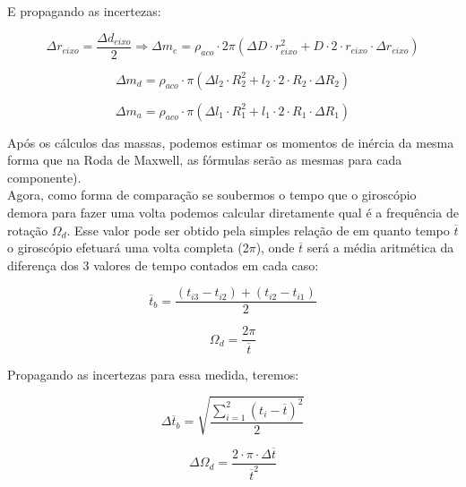 E propagando as incertezas:

\[ \Delta r_{eixo} = \frac{\Delta d_{eixo}}{2} \Rightarrow \Delta m_e = \rho_{aco} \cdot 2 \pi \left( \Delta D \cdot r_{eixo}^2 + D \cdot 2 \cdot r_{eixo} \cdot \Delta r_{eixo} \right)\]

\[ \Delta m_d = \rho_{aco} \cdot \pi \left( \Delta l_2 \cdot R_2^2 + l_2 \cdot 2 \cdot R_2 \cdot \Delta R_2 \right) \]

\[ \Delta m_a = \rho_{aco} \cdot \pi \left( \Delta l_1 \cdot R_1^2 + l_1 \cdot 2 \cdot R_1 \cdot \Delta R_1 \right) \]

Após os cálculos das massas, podemos estimar os momentos de inércia da mesma forma que na Roda de Maxwell, as fórmulas serão as mesmas para cada componente).\\

Agora, como forma de comparação se soubermos o tempo que o giroscópio demora para fazer uma volta podemos calcular diretamente qual é a frequência de rotação $\Omega _d$. Esse valor pode ser obtido pela simples relação de em quanto tempo $\overline{t}$ o giroscópio efetuará uma volta completa (2$\pi$), onde $\overline{t}$ será a média aritmética da diferença dos 3 valores de tempo contados em cada caso:

\[\overline{t}_b = \frac{(t_{i3} - t_{i2}) + (t_{i2} - t_{i1})}{2}\]

\[ \Omega _d = \frac{2\pi}{\overline{t}} \]

Propagando as incertezas para essa medida, teremos:

\[\Delta \overline{t}_b = \sqrt{\frac{\sum_{i=1}^{2} (t_i - \overline{t})^2}{2}}\]

\[\Delta \Omega _d = \frac{2 \cdot \pi \cdot \Delta \overline{t}}{\overline{t}^2}\]
